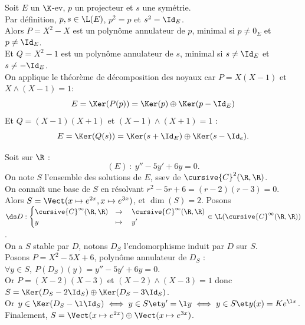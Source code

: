 \documentclass[11pt]{article}
\begin{document}
\begin{ex}{}{}
    Soit $E$ un $\K$-ev, $p$ un projecteur et $s$ une symétrie.\\
    Par définition, $p,s\in\L(E)$, $p^2=p$ et $s^2=\Id_E$.\\
    Alors $P=X^2 - X$ est un polynôme annulateur de $p$, minimal si $p\neq0_E$ et $p\neq\Id_E$.\\
    Et $Q=X^2-1$ est un polynôme annulateur de $s$, minimal si $s \neq \Id_E$ et $s\neq -\Id_E$.\\
    On applique le théorème de décomposition des noyaux car $P=X(X-1)$ et $X\land(X-1)=1$:
    \begin{equation*}
        E = \Ker(P(p)) = \Ker(p) \oplus \Ker(p-\Id_E)
    \end{equation*}
    Et $Q=(X-1)(X+1)$ et $(X-1)\land(X+1)=1$ :
    \begin{equation*}
        E = \Ker(Q(s))=\Ker(s+\Id_E) \oplus \Ker(s-\Id_e).
    \end{equation*}
\end{ex}

\vspace*{-0.5cm}

\begin{app}{}{}
    Soit sur $\R$ :
    \begin{equation*}
        (E) ~ : ~ y'' - 5y' + 6y = 0.
    \end{equation*}
    On note $S$ l'ensemble des solutions de $E$, ssev de $\cursive{C}^2(\R,\R)$.\\
    On connaît une base de $S$ en résolvant $r^2-5r+6=(r-2)(r-3)=0$.\\
    Alors $S=\Vect(x\mapsto e^{2x}, x\mapsto e^{3x})$, et $\dim(S)=2$.
    \tcblower
    Posons $\ds D:\begin{cases} \cursive{C}^{\infty}(\R,\R) &\to \quad \cursive{C}^{\infty}(\R,\R)\\ y &\mapsto \quad y'\end{cases} \in \L(\cursive{C}^{\infty}(\R,\R))$.\\
    On a $S$ stable par $D$, notons $D_S$ l'endomorphisme induit par $D$ sur $S$.\\
    Posons $P=X^2-5X+6$, polynôme annulateur de $D_S$ : $\forall y \in S, ~ P(D_S)(y)=y''-5y'+6y=0$.\\
    Or $P=(X-2)(X-3)$ et $(X-2)\land(X-3)=1$ donc $S=\Ker(D_S - 2\Id_S)\oplus \Ker(D_S-3\Id_S)$.\\
    Or $y\in\Ker(D_S-\l\Id_S) \iff y \in S \et y'=\l y \iff y\in S\et y(x)=Ke^{\l x}$.\\
    Finalement, $S=\Vect(x\mapsto e^{2x})\oplus\Vect(x\mapsto e^{3x})$.
\end{app}
\end{document}

